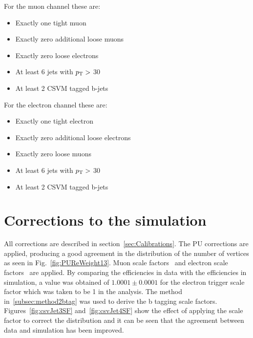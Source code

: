 For the muon channel these are:
\begin{itemize}
\setlength\itemsep{0em}
\item Exactly one tight muon
\item Exactly zero additional loose muons
\item Exactly zero loose electrons
\item At least 6 jets with $p_{\mathrm{T}} >$ 30 \GeV
\item At least 2 CSVM tagged b-jets
\end{itemize}
For the electron channel these are:
\begin{itemize}
\itemsep0em 
\item Exactly one tight electron
\item Exactly zero additional loose electrons
\item Exactly zero loose muons
\item At least 6 jets with $p_{\mathrm{T}} >$ 30 \GeV
\item At least 2 CSVM tagged b-jets
\end{itemize}

\section{Corrections to the simulation}
\label{sec:Calibrations13}
All corrections are described in section~\ref{sec:Calibrations}. The PU corrections are applied, producing a good agreement in the distribution of the number of vertices as seen in Fig.~\ref{fig:PUReWeight13}. Muon scale factors~\cite{muonSFtwiki} and electron scale factors~\cite{electronSFtwiki} are applied. By comparing the efficiencies in data with the efficiencies in simulation, a value was obtained of $1.0001\pm0.0001$ for the electron trigger scale factor which was taken to be 1 in the analysis. The method in~\ref{subsec:method2btag} was used to derive the b tagging scale factors. Figures~\ref{fig:csvJet3SF} and~\ref{fig:csvJet4SF} show the effect of applying the scale factor to correct the distribution and it can be seen that the agreement between data and simulation has been improved.


